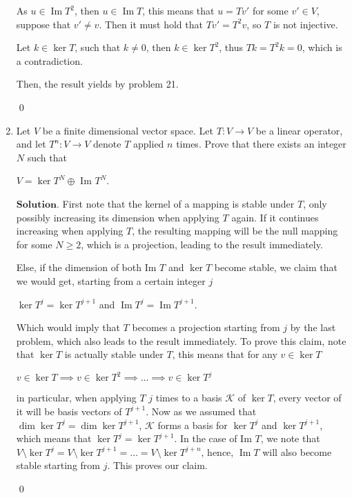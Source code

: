 \documentclass{article}
\theoremstyle{remark}
\begin{document}
\begin{enumerate}
        As $u \in \operatorname{Im }T^2$, then $u \in \operatorname{Im }T$, this means that $u = Tv'$ for some $v' \in V$, suppose that $v' \neq v$.
        Then it must hold that $Tv' = T^2v$, so $T$ is not injective.

        Let $k \in \ker T$, such that $k \neq 0$, then $k \in \ker T^2$, thus $Tk = T^2k = 0$, which is a contradiction.

        Then, the result yields by problem 21.
        \begin{flushright}
            \qed
        \end{flushright}
        \item Let $V$ be a finite dimensional vector space. Let $T: V\to V$ be a linear
        operator, and let $T^n: V \to V$ denote $T$ applied $n$ times. 
        Prove that there exists an integer $N$ such that
        \begin{center}
            $V = \ker T^N \oplus$ Im $T^N$.
        \end{center}
        $\textbf{Solution.}$ First note that the kernel of a mapping is stable under $T$, only possibly increasing its dimension when applying $T$ again.
        If it continues increasing when applying $T$, the resulting mapping will be the null mapping for some $N \geq 2$, which is a projection, leading to the result immediately.
        
        Else, if the dimension of both Im $T$ and $\ker T$ become stable, we claim that we would get, starting from a certain integer $j$
        \begin{center}
            $\ker T^j = \ker T^{j+1}$ and $\operatorname{Im} T^j = \operatorname{Im} T^{j+1}$.
        \end{center}
        Which would imply that $T$ becomes a projection starting from $j$ by the last problem, which also leads to the result immediately.
        To prove this claim, note that $\ker T$ is actually stable under $T$, this means that for any $v \in \ker T$
        \begin{center}
            $v \in \ker T \implies v \in \ker T^2 \implies \dots \implies v \in \ker T^j$
        \end{center}
        in particular, when applying $T$ $j$ times to a basis $\mathcal{K}$ of $\ker T$, every vector of it 
        will be basis vectors of $T^{j+1}$. Now as we assumed that $\dim \ker T^j = \dim \ker T^{j+1}$, $\mathcal{K}$ forms a basis for $\ker T^{j}$ and $\ker T^{j+1}$,
        which means that $\ker T^j = \ker T^{j+1}$.
        In the case of Im $T$, we note that $V \setminus \ker T^j = V \setminus \ker T^{j+1} = \dots = V \setminus \ker T^{j+n}$,
        hence, $\operatorname{Im }T$ will also become stable starting from $j$. This proves our claim.
        \begin{flushright}
            \qed
        \end{flushright}
\end{enumerate}
\end{document}
